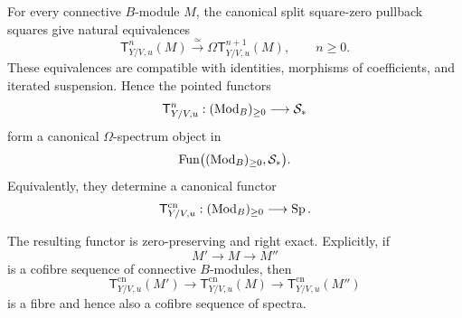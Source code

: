 \begin{proposition}
\label{prop:split-tangent-omega-spectrum}
For every connective \(B\)-module \(M\), the canonical split square-zero
pullback squares give natural equivalences
\[
    \mathsf T^n_{Y/V,u}(M)
    \xrightarrow{\simeq}
    \Omega\mathsf T^{n+1}_{Y/V,u}(M),
    \qquad n\geq0.
\]
These equivalences are compatible with identities, morphisms of coefficients,
and iterated suspension. Hence the pointed functors
\[
    \mathsf T^n_{Y/V,u}:
    (\operatorname{Mod}_B)_{\geq0}
    \longrightarrow
    \mathcal S_*
\]
form a canonical \(\Omega\)-spectrum object in
\[
    \operatorname{Fun}\bigl((\operatorname{Mod}_B)_{\geq0},\mathcal S_*\bigr).
\]
Equivalently, they determine a canonical functor
\[
    \mathsf T^{\mathrm{cn}}_{Y/V,u}:
    (\operatorname{Mod}_B)_{\geq0}
    \longrightarrow
    \operatorname{Sp}.
\]

The resulting functor is zero-preserving and right exact. Explicitly, if
\[
    M'\longrightarrow M\longrightarrow M''
\]
is a cofibre sequence of connective \(B\)-modules, then
\[
    \mathsf T^{\mathrm{cn}}_{Y/V,u}(M')
    \longrightarrow
    \mathsf T^{\mathrm{cn}}_{Y/V,u}(M)
    \longrightarrow
    \mathsf T^{\mathrm{cn}}_{Y/V,u}(M'')
\]
is a fibre and hence also a cofibre sequence of spectra.
\end{proposition}


